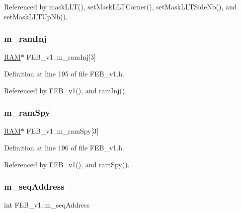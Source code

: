 Referenced by mask\+L\+L\+T(), set\+Mask\+L\+L\+T\+Corner(), set\+Mask\+L\+L\+T\+Side\+Nb(), and set\+Mask\+L\+L\+T\+Up\+Nb().

\mbox{\label{classFEB__v1_a3a3d06225c94c88d4cc5da7a6bde3867}} 
\subsubsection{\texorpdfstring{m\+\_\+ram\+Inj}{m\_ramInj}}
{\footnotesize\ttfamily \hyperlink{classRAM}{R\+AM}$\ast$ F\+E\+B\+\_\+v1\+::m\+\_\+ram\+Inj\mbox{[}3\mbox{]}\hspace{0.3cm}{\ttfamily [private]}}



Definition at line 195 of file F\+E\+B\+\_\+v1.\+h.



Referenced by F\+E\+B\+\_\+v1(), and ram\+Inj().

\mbox{\label{classFEB__v1_ae6d8176c12bd60ad25ed81d535eb8c82}} 
\subsubsection{\texorpdfstring{m\+\_\+ram\+Spy}{m\_ramSpy}}
{\footnotesize\ttfamily \hyperlink{classRAM}{R\+AM}$\ast$ F\+E\+B\+\_\+v1\+::m\+\_\+ram\+Spy\mbox{[}3\mbox{]}\hspace{0.3cm}{\ttfamily [private]}}



Definition at line 196 of file F\+E\+B\+\_\+v1.\+h.



Referenced by F\+E\+B\+\_\+v1(), and ram\+Spy().

\mbox{\label{classFEB__v1_a1c1eb093fd1733b9510fcf8bc5c7ad08}} 
\subsubsection{\texorpdfstring{m\+\_\+seq\+Address}{m\_seqAddress}}
{\footnotesize\ttfamily int F\+E\+B\+\_\+v1\+::m\+\_\+seq\+Address\hspace{0.3cm}{\ttfamily [private]}}



